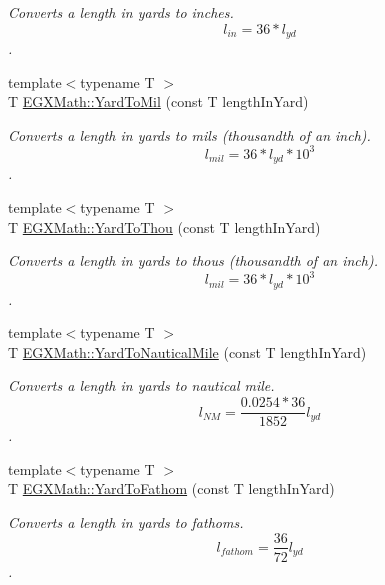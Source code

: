 \begin{DoxyCompactItemize}
\begin{DoxyCompactList}\small\item\em Converts a length in yards to inches. \[ l_{in}= 36 * l_{yd} \]. \end{DoxyCompactList}\item 
{\footnotesize template$<$typename T $>$ }\\T \mbox{\hyperlink{group___e_g_x_math-_conversions-_length_conversions-_imperial-_yard-_imperial_ga9ff8041d33178b44c133dbbd37a8b267}{E\+G\+X\+Math\+::\+Yard\+To\+Mil}} (const T length\+In\+Yard)
\begin{DoxyCompactList}\small\item\em Converts a length in yards to mils (thousandth of an inch). \[ l_{mil}=36 * l_{yd} * 10^{3} \]. \end{DoxyCompactList}\item 
{\footnotesize template$<$typename T $>$ }\\T \mbox{\hyperlink{group___e_g_x_math-_conversions-_length_conversions-_imperial-_yard-_imperial_ga396e348746bc01bce2844579b2b3d90f}{E\+G\+X\+Math\+::\+Yard\+To\+Thou}} (const T length\+In\+Yard)
\begin{DoxyCompactList}\small\item\em Converts a length in yards to thous (thousandth of an inch). \[ l_{mil}=36 * l_{yd} * 10^{3} \]. \end{DoxyCompactList}\item 
{\footnotesize template$<$typename T $>$ }\\T \mbox{\hyperlink{group___e_g_x_math-_conversions-_length_conversions-_imperial-_yard-_nautical_gafdd0ac310bcfdaf8cf676f823018b6d7}{E\+G\+X\+Math\+::\+Yard\+To\+Nautical\+Mile}} (const T length\+In\+Yard)
\begin{DoxyCompactList}\small\item\em Converts a length in yards to nautical mile. \[ l_{NM}= \frac{0.0254 * 36}{1852} l_{yd} \]. \end{DoxyCompactList}\item 
{\footnotesize template$<$typename T $>$ }\\T \mbox{\hyperlink{group___e_g_x_math-_conversions-_length_conversions-_imperial-_yard-_nautical_ga74f4a71a621c03bbf1c540710719ec25}{E\+G\+X\+Math\+::\+Yard\+To\+Fathom}} (const T length\+In\+Yard)
\begin{DoxyCompactList}\small\item\em Converts a length in yards to fathoms. \[ l_{fathom}= \frac{36}{72} l_{yd} \]. \end{DoxyCompactList}\item 

\end{DoxyCompactItemize}
